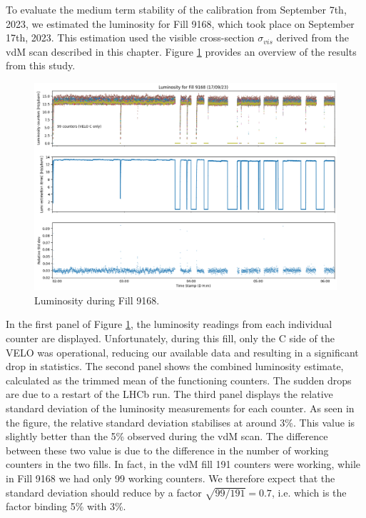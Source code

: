 To evaluate the medium term stability of the calibration from September 7th, 2023, we estimated the luminosity for Fill 9168, which took place on September 17th, 2023. This estimation used the visible cross-section $\sigma_{vis}$ derived from the vdM scan described in this chapter. Figure \ref{fig:fill9168} provides an overview of the results from this study.
\begin{figure}
    \centering
    \includegraphics[width=\textwidth]{figures/fill9168.png}
    \caption{Luminosity during Fill 9168.}
    \label{fig:fill9168}
\end{figure}
In the first panel of Figure \ref{fig:fill9168}, the luminosity readings from each individual counter are displayed. Unfortunately, during this fill, only the C side of the VELO was operational, reducing our available data and resulting in a significant drop in statistics. The second panel shows the combined luminosity estimate, calculated as the trimmed mean of the functioning counters. The sudden drops are due to a restart of the LHCb run.  The third panel displays the relative standard deviation of the luminosity measurements for each counter. As seen in the figure, the relative standard deviation stabilises at around 3\%. This value is slightly better than the 5\% observed during the vdM scan. The difference between these two value is due to the difference in the number of working counters in the two fills. In fact, in the vdM fill 191 counters were working, while in Fill 9168 we had only 99 working counters. We therefore expect that the standard deviation should reduce by a factor $\sqrt{99/191}=0.7$, i.e. which is the factor binding 5\% with 3\%.


